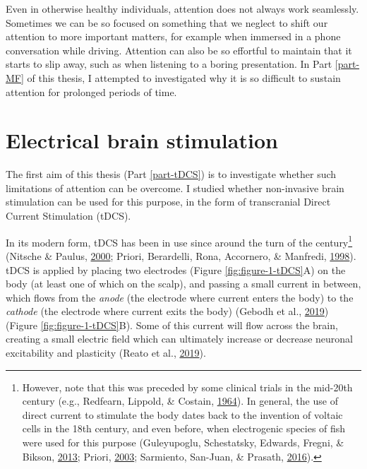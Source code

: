 \documentclass[11pt,]{memoir}
\let\rmarkdownfootnote\footnote%
\def\footnote{\protect\rmarkdownfootnote}
\begin{document}
Even in otherwise healthy individuals, attention does not always work seamlessly. Sometimes we can be so focused on something that we neglect to shift our attention to more important matters, for example when immersed in a phone conversation while driving. Attention can also be so effortful to maintain that it starts to slip away, such as when listening to a boring presentation. In Part \ref{part-MF} of this thesis, I attempted to investigated why it is so difficult to sustain attention for prolonged periods of time.

\hypertarget{electrical-brain-stimulation}{%
\section{Electrical brain stimulation}\label{electrical-brain-stimulation}}

The first aim of this thesis (Part \ref{part-tDCS}) is to investigate whether such limitations of attention can be overcome. I studied whether non-invasive brain stimulation can be used for this purpose, in the form of transcranial Direct Current Stimulation (tDCS).

In its modern form, tDCS has been in use since around the turn of the century\footnote{However, note that this was preceded by some clinical trials in the mid-20th century (e.g., Redfearn, Lippold, \& Costain, \protect\hyperlink{ref-Redfearn1964}{1964}). In general, the use of direct current to stimulate the body dates back to the invention of voltaic cells in the 18th century, and even before, when electrogenic species of fish were used for this purpose (Guleyupoglu, Schestatsky, Edwards, Fregni, \& Bikson, \protect\hyperlink{ref-Guleyupoglu2013}{2013}; Priori, \protect\hyperlink{ref-Priori2003}{2003}; Sarmiento, San-Juan, \& Prasath, \protect\hyperlink{ref-Sarmiento2016}{2016}).} (Nitsche \& Paulus, \protect\hyperlink{ref-Nitsche2000}{2000}; Priori, Berardelli, Rona, Accornero, \& Manfredi, \protect\hyperlink{ref-Priori1998}{1998}). tDCS is applied by placing two electrodes (Figure \ref{fig:figure-1-tDCS}A) on the body (at least one of which on the scalp), and passing a small current in between, which flows from the \emph{anode} (the electrode where current enters the body) to the \emph{cathode} (the electrode where current exits the body) (Gebodh et al., \protect\hyperlink{ref-Gebodh2019a}{2019}) (Figure \ref{fig:figure-1-tDCS}B). Some of this current will flow across the brain, creating a small electric field which can ultimately increase or decrease neuronal excitability and plasticity (Reato et al., \protect\hyperlink{ref-Reato2019}{2019}).
\end{document}
